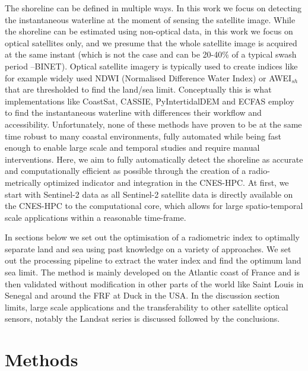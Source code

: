 \documentclass[remotesensing,article,submit,pdftex,moreauthors]{Definitions/mdpi}
\begin{document}
The shoreline can be defined in multiple ways. In this work we focus on detecting the instantaneous waterline at the moment of sensing the satellite image. While the shoreline can be estimated using non-optical data, in this work we focus on optical satellites only, and we presume that the whole satellite image is acquired at the same instant (which is not the case and can be 20-40\% of a typical swash period --BINET). Optical satellite imagery is typically used to create indices like for example widely used NDWI (Normalised Difference Water Index) or AWEI$_{sh}$ that are thresholded to find the land/sea limit. Conceptually this is what implementations like CoastSat, CASSIE, PyIntertidalDEM and ECFAS employ to find the instantaneous waterline with differences their workflow and accessibility. Unfortunately, none of these methods have proven to be at the same time robust to many coastal environments, fully automated while being fast enough to enable large scale and temporal studies and require manual interventions. Here, we aim to fully automatically detect the shoreline as accurate and computationally efficient as possible through the creation of a radio-metrically optimized indicator and integration in the CNES-HPC. At first, we start with Sentinel-2 data as all Sentinel-2 satellite data is directly available on the CNES-HPC to the computational core, which allows for large spatio-temporal scale applications within a reasonable time-frame.

In sections below we set out the optimisation of a radiometric index to optimally separate land and sea using past knowledge on a variety of approaches. We set out the processing pipeline to extract the water index and find the optimum land sea limit. The method is mainly developed on the Atlantic coast of France and is then validated without modification in other parts of the world like Saint Louis in Senegal and around the FRF at Duck in the USA. In the discussion section limits, large scale applications and the transferability to other satellite optical sensors, notably the Landsat series is discussed followed by the conclusions.

\section{Methods}
\end{document}
